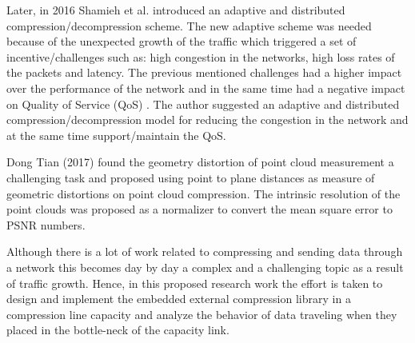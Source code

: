 \documentclass[sigconf]{acmart}
\begin{document}
Later, in 2016 Shamieh et al. \cite{shamieh2016adaptive} introduced  an adaptive and distributed compression/decompression scheme. The new adaptive scheme was needed because of the unexpected growth of the traffic which triggered a set of incentive/challenges such as: high congestion in the networks, high loss rates of the packets and latency. The previous mentioned challenges had a higher impact over the performance of the network and in the same time had a negative impact on Quality of Service (QoS) . The author suggested an adaptive and distributed compression/decompression model for reducing the congestion in the network and at the same time support/maintain the QoS.

Dong Tian (2017) found the geometry distortion of point cloud measurement  a challenging task and proposed using point to plane distances as measure of geometric distortions on point cloud compression. The intrinsic resolution of the point clouds was proposed as a normalizer to convert the mean square error to PSNR numbers. \cite{tian2017geometric}

Although there is a lot of work related to compressing and sending data through a network \cite{serfozo1999little}\cite{shimamura2010compressing}\cite{tan2010enhanced} this becomes day by day a complex and a challenging topic as a result of traffic growth. 
Hence, in this proposed research work the effort is taken to design and implement the embedded external compression library in a compression line capacity and analyze the behavior of data traveling when they placed in the bottle-neck of the capacity link. 
\end{document}
